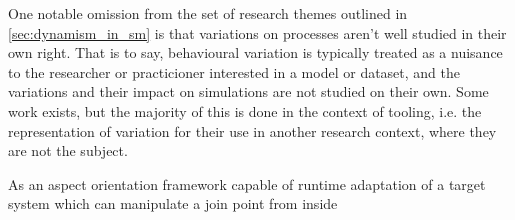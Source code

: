 One notable omission from the set of research themes outlined in
\cref{sec:dynamism_in_sm} is that variations on processes aren't well
studied in their own right. That is to say, behavioural variation is typically
treated as a nuisance to the researcher or practicioner interested in a model or
dataset, and the variations and their impact on simulations are not studied on
their own. Some work exists, but the majority of this is done in the context of tooling, i.e.
the representation of variation for their use in another research context, where
they are not the subject.

As an aspect orientation framework capable of runtime adaptation of a target
system which can manipulate a join point from inside 
